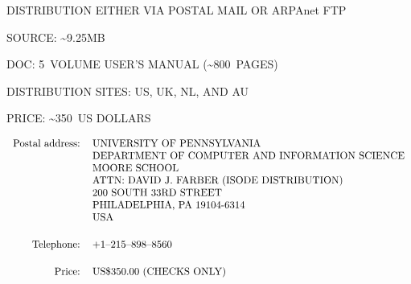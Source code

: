 \begin{bwslide}

\begin{nrtc}
\item	DISTRIBUTION EITHER VIA POSTAL MAIL OR ARPAnet FTP
    \begin{nrtc}
    \item	SOURCE: \~{}9.25MB

    \item	DOC: 5~VOLUME USER'S MANUAL (\~{}800~PAGES)

    \item	DISTRIBUTION SITES: US, UK, NL, AND AU

    \item	PRICE: \~{}350~US DOLLARS
    \end{nrtc}
\end{nrtc}
\end{bwslide}


\begin{bwslide}
\small

\[\begin{tabular}{rl}
Postal address:&UNIVERSITY OF PENNSYLVANIA\\
&		DEPARTMENT OF COMPUTER AND INFORMATION SCIENCE\\
&		MOORE SCHOOL\\
&		ATTN: DAVID J. FARBER (ISODE DISTRIBUTION)\\
&		200 SOUTH 33RD STREET\\
&		PHILADELPHIA, PA 19104-6314\\
&		USA\\[0.2in]
Telephone:&	+1--215--898--8560\\[0.2in]
Price:&		US\$350.00 (CHECKS ONLY)
\end{tabular}\]
\end{bwslide}


